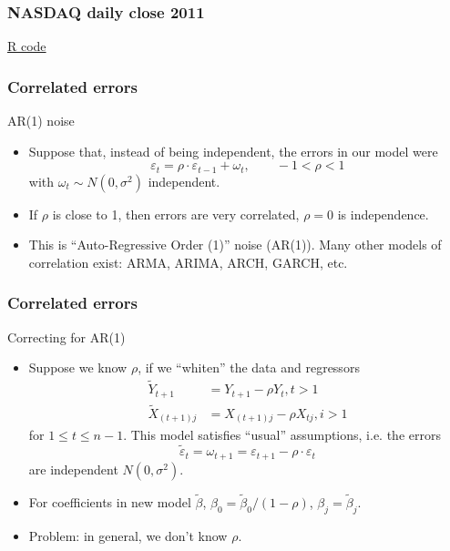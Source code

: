 \documentclass[handout]{beamer}
\begin{document}
   \begin{frame}
   \frametitle{NASDAQ daily close 2011}
   \begin{center}
   \end{center}
   \href{http://stats191.stanford.edu/correlated_errors.html#nasdaq}{R code}
   \end{frame}


   \begin{frame} \frametitle{Correlated errors}

   \begin{block}
   {AR(1) noise}
   \begin{itemize}

   \item Suppose that, instead of being independent, the errors in our model were
   $$
   \varepsilon_t = \rho \cdot \varepsilon_{t-1} + \omega_t, \qquad -1 < \rho < 1$$
   with $\omega_t \sim N(0,\sigma^2)$ independent.
   \item If $\rho$ is close to 1, then errors are very correlated, $\rho=0$ is independence.
   \item This is ``Auto-Regressive Order (1)'' noise (AR(1)). Many other
   models of correlation exist: ARMA, ARIMA, ARCH, GARCH, etc.
   \end{itemize}

   \end{block}
   \end{frame}


   \begin{frame} \frametitle{Correlated errors}

   \begin{block}
   {Correcting for AR(1)                      }
   \begin{itemize}
   \item Suppose we know $\rho$, if we ``whiten'' the data and regressors
   $$
   \begin{aligned}
   \tilde{Y}_{t+1} &= Y_{t+1} - \rho Y_t, t > 1   \\
   \tilde{X}_{(t+1)j} &= X_{(t+1)j} - \rho X_{tj}, i > 1
   \end{aligned}
   $$
   for $1 \leq t \leq n-1$.
   This model satisfies ``usual'' assumptions, i.e. the errors
   $$
   \tilde{\varepsilon}_t = \omega_{t+1} = \varepsilon_{t+1} - \rho \cdot \varepsilon_t$$
   are independent $N(0,\sigma^2)$.

   \item For coefficients in new model $\tilde{\beta}$, $\beta_0 = \tilde{\beta}_0 / (1 - \rho)$, $\beta_j = \tilde{\beta}_j.$

   \item Problem: in general, we don't know $\rho$.
   \end{itemize}
   \end{block}
   \end{frame}
\end{document}
